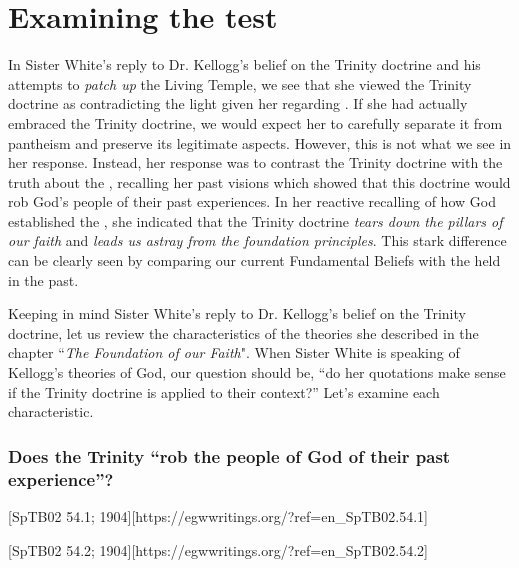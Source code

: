 \chapter{Examining the test}

In Sister White's reply to Dr. Kellogg's belief on the Trinity doctrine and his attempts to \textit{patch up} the Living Temple, we see that she viewed the Trinity doctrine as contradicting the light given her regarding . If she had actually embraced the Trinity doctrine, we would expect her to carefully separate it from pantheism and preserve its legitimate aspects. However, this is not what we see in her response. Instead, her response was to contrast the Trinity doctrine with the truth about the , recalling her past visions which showed that this doctrine would rob God's people of their past experiences. In her reactive recalling of how God established the , she indicated that the Trinity doctrine \textit{tears down the pillars of our faith} and \textit{leads us astray from the foundation principles}. This stark difference can be clearly seen by comparing our current Fundamental Beliefs with the  held in the past.

Keeping in mind Sister White’s reply to Dr. Kellogg's belief on the Trinity doctrine, let us review the characteristics of the theories she described in the chapter “\textit{The Foundation of our Faith}". When Sister White is speaking of Kellogg’s theories of God, our question should be, “do her quotations make sense if the Trinity doctrine is applied to their context?” Let’s examine each characteristic.

\subsection*{Does the Trinity “rob the people of God of their past experience”?}

[SpTB02 54.1; 1904][https://egwwritings.org/?ref=en\_SpTB02.54.1]

[SpTB02 54.2; 1904][https://egwwritings.org/?ref=en\_SpTB02.54.2]

